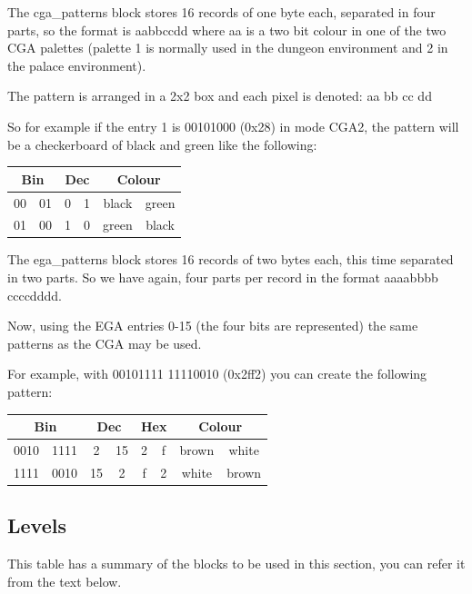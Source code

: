 \documentclass{article}
\begin{document}
\pagebreak[2]
 The cga\_patterns block stores 16 records of one byte each, separated in
 four parts, so the format is aabbccdd where aa is a two bit colour in one
 of the two CGA palettes (palette 1 is normally used in the  dungeon
 environment and 2 in the palace environment).
 
 The pattern is arranged in a 2x2 box and each pixel is denoted:
  aa bb
  cc dd
 
 So for example if the entry 1 is 00101000 (0x28) in mode CGA2, the pattern
 will be a checkerboard of black and green like the following:

\begin{center}
\begin{tabular}{cc|cc|cc}
  \multicolumn{2}{c}{Bin} & \multicolumn{2}{c}{Dec} & \multicolumn{2}{c}{Colour} \\
 \hline
  00& 01&    0& 1&    black&  green \\
  01& 00&    1& 0&    green&  black \\
\end{tabular}
\end{center}

 The ega\_patterns block stores 16 records of two bytes each, this time
 separated in two parts. So we have again, four parts per record in the
 format aaaabbbb ccccdddd.
 
 Now, using the EGA entries 0-15 (the four bits are represented) the same
 patterns as the CGA may be used.
 
 For example, with 00101111 11110010 (0x2ff2) you can create the following
 pattern:

\begin{center}
\begin{tabular}{cc|cc|cc|cc}
  \multicolumn{2}{c}{Bin} & \multicolumn{2}{c}{Dec} & \multicolumn{2}{c}{Hex} & \multicolumn{2}{c}{Colour} \\
 \hline
  0010& 1111  &  2 & 15  &2&f&  brown&  white\\
  1111& 0010  &  15& 2   &f&2&  white&  brown\\
\end{tabular}
\end{center}

\subsection{Levels \label{level blocks}}
 This table has a summary of the blocks to be used in this section,
 you can refer it from the text below.
\end{document}
